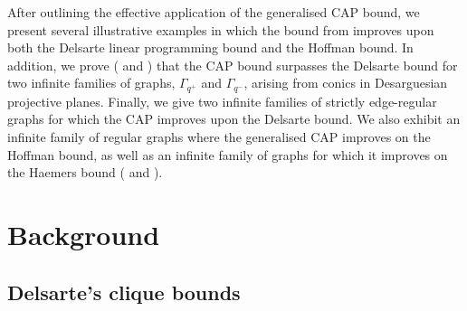 \documentclass[11pt, baustms]{amsproc}
\theoremstyle{scplain}
\newtheorem{theorem}{Theorem}[section]
\newcommand\CA{\mathrm{CA}}
\begin{document}



After outlining the effective application of the generalised CAP bound, we present several illustrative examples in which the bound from   improves upon both the Delsarte linear programming bound and the Hoffman bound. In addition, we prove ( and ) that the CAP bound surpasses the Delsarte bound for two infinite families of graphs, $\Gamma_{q^+}$ and $\Gamma_{q^-}$, arising from conics in Desarguesian projective planes. Finally, we give two infinite families of strictly edge-regular graphs for which the CAP improves upon the Delsarte bound. We also exhibit an infinite family of regular graphs where the generalised CAP improves on the Hoffman bound, as well as an infinite family of graphs for which it improves on the Haemers bound ( and ).


\section{Background}


  \subsection{Delsarte's clique bounds}
\end{document}
